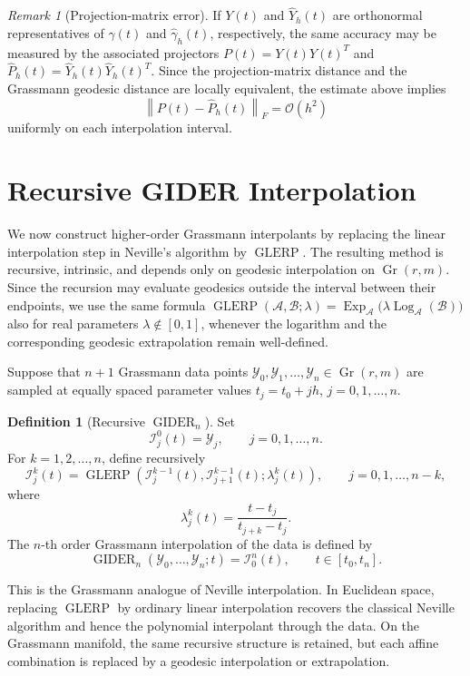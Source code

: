 \documentclass[a4paper,11pt]{article}
\newcommand{\Log}{\operatorname{Log}}
\newcommand{\Exp}{\operatorname{Exp}}
\DeclareMathOperator{\Gr}{Gr}
\newcommand{\norm}[1]{\left\lVert #1 \right\rVert}
\newcommand{\GLERP}{\operatorname{GLERP}}
\newcommand{\GIDER}{\operatorname{GIDER}}
\numberwithin{equation}{section}
\theoremstyle{plain}
\theoremstyle{definition}
\newtheorem{definition}[thm]{Definition}
\theoremstyle{remark}
\newtheorem{remark}[thm]{Remark}
\begin{document}
\begin{remark}[Projection-matrix error]
If \(Y(t)\) and \(\widehat{Y}_h(t)\) are orthonormal representatives of \(\gamma(t)\) and \(\widehat{\gamma}_h(t)\), respectively, the same accuracy may be measured by the associated projectors \(P(t)=Y(t)Y(t)^T\) and \(\widehat{P}_h(t)=\widehat{Y}_h(t)\widehat{Y}_h(t)^T\). Since the projection-matrix distance and the Grassmann geodesic distance are locally equivalent, the estimate above implies
\[
    \norm{P(t)-\widehat{P}_h(t)}_F
    =
    \mathcal{O}(h^2)
\]
uniformly on each interpolation interval.
\end{remark}

%

\section{Recursive GIDER Interpolation}\label{sec:gider}

We now construct higher-order Grassmann interpolants by replacing the linear interpolation step in Neville's algorithm by \(\GLERP\).  The resulting method is recursive, intrinsic, and depends only on geodesic interpolation on \(\Gr(r,m)\).  Since the recursion may evaluate geodesics outside the interval between their endpoints, we use the same formula \(\GLERP(\mathcal{A},\mathcal{B};\lambda)=\Exp_{\mathcal{A}}\bigl(\lambda\Log_{\mathcal{A}}(\mathcal{B})\bigr)\) also for real parameters \(\lambda\notin[0,1]\), whenever the logarithm and the corresponding geodesic extrapolation remain well-defined.

Suppose that \(n+1\) Grassmann data points \(\mathcal{Y}_0,\mathcal{Y}_1,\ldots,\mathcal{Y}_n\in\Gr(r,m)\) are sampled at equally spaced parameter values \(t_j=t_0+jh\), \(j=0,1,\ldots,n\).

\begin{definition}[Recursive \(\GIDER_n\)]\label{def:gider}
Set
\[
    \mathcal{I}_j^0(t)=\mathcal{Y}_j,
    \qquad j=0,1,\ldots,n.
\]
For \(k=1,2,\ldots,n\), define recursively
\[
    \mathcal{I}_j^k(t)
    =
    \GLERP\left(
        \mathcal{I}_j^{k-1}(t),
        \mathcal{I}_{j+1}^{k-1}(t);
        \lambda_j^k(t)
    \right),
    \qquad
    j=0,1,\ldots,n-k,
\]
where
\[
    \lambda_j^k(t)=\frac{t-t_j}{t_{j+k}-t_j}.
\]
The \(n\)-th order Grassmann interpolation of the data is defined by
\[
    \GIDER_n(\mathcal{Y}_0,\ldots,\mathcal{Y}_n;t)=\mathcal{I}_0^n(t),
    \qquad t\in[t_0,t_n].
\]
\end{definition}

This is the Grassmann analogue of Neville interpolation.  In Euclidean space, replacing \(\GLERP\) by ordinary linear interpolation recovers the classical Neville algorithm and hence the polynomial interpolant through the data.  On the Grassmann manifold, the same recursive structure is retained, but each affine combination is replaced by a geodesic interpolation or extrapolation.
\end{document}
